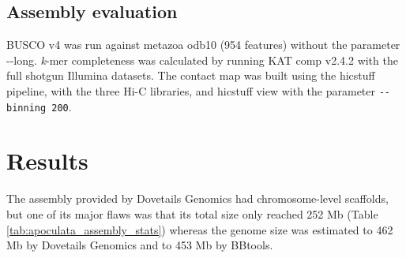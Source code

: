\subsection{Assembly evaluation}

BUSCO v4 \cite{busco_evaluation} was run against metazoa odb10 (954 features) without the parameter -{}-long. \textit{k}-mer completeness was calculated by running KAT comp v2.4.2 \cite{kat_evaluation} with the full shotgun Illumina datasets. The contact map was built using the hicstuff pipeline, with the three Hi-C libraries, and hicstuff view with the parameter \texttt{-{}-binning 200}. \\

\section{Results}

The assembly provided by Dovetails Genomics had chromosome-level scaffolds, but one of its major flaws was that its total size only reached 252 Mb (Table \ref{tab:apoculata_assembly_stats}) whereas the genome size was estimated to 462 Mb by Dovetails Genomics and to 453 Mb by BBtools. \\

